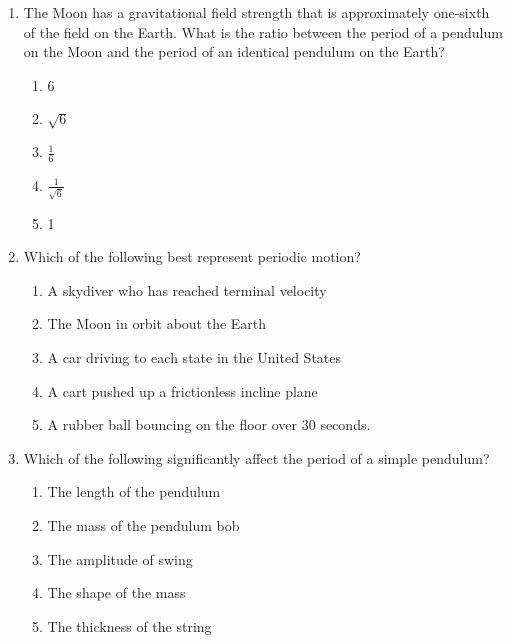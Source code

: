 \documentclass{../../../oss-classkick}
\begin{document}
\begin{multicols}{2}
\begin{enumerate}[leftmargin=18pt]
  \item The Moon has a gravitational field strength that is approximately
    one-sixth of the field on the Earth. What is the ratio between the period
    of a pendulum on the Moon and the period of an identical pendulum on the
    Earth?
    \begin{enumerate}[nosep,leftmargin=18pt,label=(\Alph*)]
    \item 6
    \item $\sqrt{6}$
    \item $\displaystyle\frac16$
    \item $\displaystyle\frac1{\sqrt6}$
    \item 1
    \end{enumerate}

  \item Which of the following best represent periodic motion?
    \begin{enumerate}[nosep,leftmargin=18pt,label=(\Alph*)]
    \item A skydiver who has reached terminal velocity
    \item The Moon in orbit about the Earth
    \item A car driving to each state in the United States
    \item A cart pushed up a frictionless incline plane
    \item A rubber ball bouncing on the floor over 30 seconds.
    \end{enumerate}
    \vspace{.7in}
    
  \item  Which of the following significantly affect the period of a simple
    pendulum?
    \begin{enumerate}[nosep,leftmargin=18pt,label=(\Alph*)]
    \item The length of the pendulum
    \item The mass of the pendulum bob
    \item The amplitude of swing
    \item The shape of the mass
    \item The thickness of the string
    \end{enumerate}
    \columnbreak    


\end{enumerate}
\end{multicols}
\end{document}
